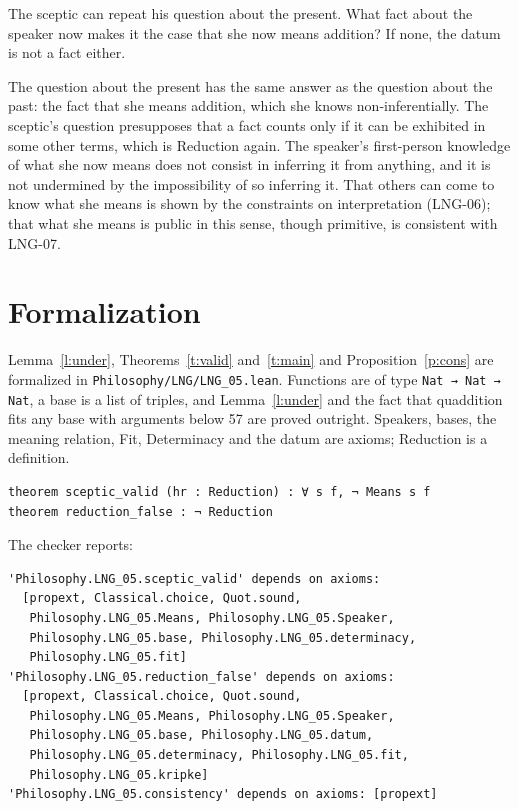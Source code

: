 \documentclass{situationist-preprint}
\begin{document}
\begin{objection}
The sceptic can repeat his question about the present. What fact about the speaker now makes it the case that she now means addition? If none, the datum is not a fact either.
\end{objection}

\begin{reply}
The question about the present has the same answer as the question about the past: the fact that she means addition, which she knows non-inferentially. The sceptic's question presupposes that a fact counts only if it can be exhibited in some other terms, which is Reduction again. The speaker's first-person knowledge of what she now means does not consist in inferring it from anything, and it is not undermined by the impossibility of so inferring it. That others can come to know what she means is shown by the constraints on interpretation (LNG-06); that what she means is public in this sense, though primitive, is consistent with LNG-07.
\end{reply}

\section{Formalization}

Lemma~\ref{l:under}, Theorems~\ref{t:valid} and~\ref{t:main} and Proposition~\ref{p:cons} are formalized in \nolinkurl{Philosophy/LNG/LNG_05.lean}. Functions are of type \texttt{Nat → Nat → Nat}, a base is a list of triples, and Lemma~\ref{l:under} and the fact that quaddition fits any base with arguments below 57 are proved outright. Speakers, bases, the meaning relation, Fit, Determinacy and the datum are axioms; Reduction is a definition.

\begin{lstlisting}
theorem sceptic_valid (hr : Reduction) : ∀ s f, ¬ Means s f
theorem reduction_false : ¬ Reduction
\end{lstlisting}

The checker reports:

\begin{lstlisting}
'Philosophy.LNG_05.sceptic_valid' depends on axioms:
  [propext, Classical.choice, Quot.sound,
   Philosophy.LNG_05.Means, Philosophy.LNG_05.Speaker,
   Philosophy.LNG_05.base, Philosophy.LNG_05.determinacy,
   Philosophy.LNG_05.fit]
'Philosophy.LNG_05.reduction_false' depends on axioms:
  [propext, Classical.choice, Quot.sound,
   Philosophy.LNG_05.Means, Philosophy.LNG_05.Speaker,
   Philosophy.LNG_05.base, Philosophy.LNG_05.datum,
   Philosophy.LNG_05.determinacy, Philosophy.LNG_05.fit,
   Philosophy.LNG_05.kripke]
'Philosophy.LNG_05.consistency' depends on axioms: [propext]
\end{lstlisting}
\end{document}
